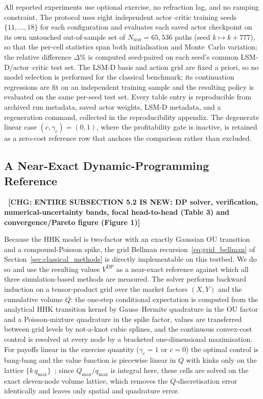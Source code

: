 \documentclass[a4paper,fleqn]{cas-dc}
\newcommand{\hlblock}[1]{\par\noindent
    \colorbox{chgyellow}{\parbox{\dimexpr\linewidth-2\fboxsep\relax}{#1}}\par}
\newcommand{\hlblock}[1]{#1}
\newcommand{\chg}[1]{{\normalfont\bfseries\color{red}~[CHG: \textsf{\footnotesize #1}]~}}
\newcommand{\chg}[1]{}
\begin{document}
All reported experiments use optional exercise, no refraction lag, and no ramping constraint. The protocol uses eight independent actor--critic training seeds $\{11,\dots,18\}$ for each configuration and evaluates each saved actor checkpoint on its own untouched out-of-sample set of $N_{\mathrm{test}} = 65{,}536$ paths (seed $k\!\mapsto\!k+777$), so that the per-cell statistics span both initialisation and Monte~Carlo variation; the relative difference $\Delta\%$ is computed seed-paired on each seed's common LSM-D/actor--critic test set. The LSM-D basis and action grid are fixed a priori, so no model selection is performed for the classical benchmark; its continuation regressions are fit on an independent training sample and the resulting policy is evaluated on the same per-seed test set. Every table entry is reproducible from archived run metadata, saved actor weights, LSM-D metadata, and a regeneration command, collected in the reproducibility appendix. The degenerate linear case $(c,\gamma_c)=(0,1)$, where the profitability gate is inactive, is retained as a zero-cost reference row that anchors the comparison rather than excluded.

\subsection{A Near-Exact Dynamic-Programming Reference}
\label{sec:dp_reference}
\chg{ENTIRE SUBSECTION 5.2 IS NEW: DP solver, verification, numerical-uncertainty bands, focal head-to-head (Table 3) and convergence/Pareto figure (Figure 1)}

\hlblock{Because the HHK model is two-factor with an exactly Gaussian OU transition and a compound-Poisson spike, the grid Bellman recursion~\eqref{eq:grid_bellman} of Section~\ref{sec:classical_methods} is directly implementable on this testbed. We do so and use the resulting values $V^{\mathrm{DP}}$ as a near-exact reference against which all three simulation-based methods are measured. The solver performs backward induction on a tensor-product grid over the market factors $(X,Y)$ and the cumulative volume $Q$: the one-step conditional expectation is computed from the analytical HHK transition kernel by Gauss--Hermite quadrature in the OU factor and a Poisson-mixture quadrature in the spike factor, values are transferred between grid levels by not-a-knot cubic splines, and the continuous convex-cost control is resolved at every node by a bracketed one-dimensional maximisation. For payoffs linear in the exercise quantity ($\gamma_c=1$ or $c=0$) the optimal control is bang-bang and the value function is piecewise linear in $Q$ with kinks only on the lattice $\{k\,q_{\max}\}$~\cite{bardou2010bangbang}; since $Q_{\max}/q_{\max}$ is integral here, these cells are solved on the exact eleven-node volume lattice, which removes the $Q$-discretisation error identically and leaves only spatial and quadrature error.}
\end{document}
